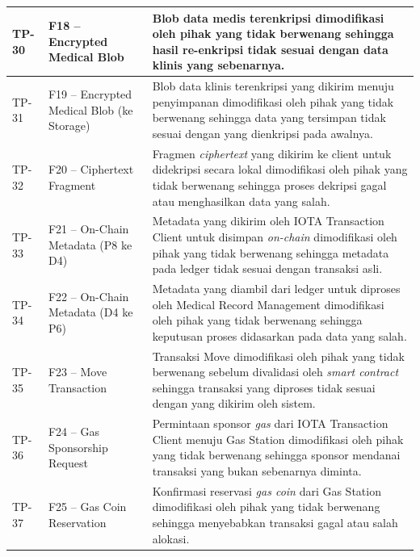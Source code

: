 \begin{xltabular}{\textwidth}{|>{\centering\arraybackslash}p{1.8cm}|>{\raggedright\arraybackslash}p{3.2cm}|X|}
    TP-30 &
    F18 -- Encrypted Medical Blob &
    Blob data medis terenkripsi dimodifikasi oleh pihak yang tidak berwenang sehingga hasil re-enkripsi tidak sesuai dengan data klinis yang sebenarnya. \\
    \hline

    TP-31 &
    F19 -- Encrypted Medical Blob (ke Storage) &
    Blob data klinis terenkripsi yang dikirim menuju penyimpanan dimodifikasi oleh pihak yang tidak berwenang sehingga data yang tersimpan tidak sesuai dengan yang dienkripsi pada awalnya. \\
    \hline

    TP-32 &
    F20 -- Ciphertext Fragment &
    Fragmen \textit{ciphertext} yang dikirim ke client untuk didekripsi secara lokal dimodifikasi oleh pihak yang tidak berwenang sehingga proses dekripsi gagal atau menghasilkan data yang salah. \\
    \hline

    TP-33 &
    F21 -- On-Chain Metadata (P8 ke D4) &
    Metadata yang dikirim oleh IOTA Transaction Client untuk disimpan \textit{on-chain} dimodifikasi oleh pihak yang tidak berwenang sehingga metadata pada ledger tidak sesuai dengan transaksi asli. \\
    \hline

    TP-34 &
    F22 -- On-Chain Metadata (D4 ke P6) &
    Metadata yang diambil dari ledger untuk diproses oleh Medical Record Management dimodifikasi oleh pihak yang tidak berwenang sehingga keputusan proses didasarkan pada data yang salah. \\
    \hline

    TP-35 &
    F23 -- Move Transaction &
    Transaksi Move dimodifikasi oleh pihak yang tidak berwenang sebelum divalidasi oleh \textit{smart contract} sehingga transaksi yang diproses tidak sesuai dengan yang dikirim oleh sistem. \\
    \hline

    TP-36 &
    F24 -- Gas Sponsorship Request &
    Permintaan sponsor \textit{gas} dari IOTA Transaction Client menuju Gas Station dimodifikasi oleh pihak yang tidak berwenang sehingga sponsor mendanai transaksi yang bukan sebenarnya diminta. \\
    \hline

    TP-37 &
    F25 -- Gas Coin Reservation &
    Konfirmasi reservasi \textit{gas coin} dari Gas Station dimodifikasi oleh pihak yang tidak berwenang sehingga menyebabkan transaksi gagal atau salah alokasi. \\
    \hline


\end{xltabular}
